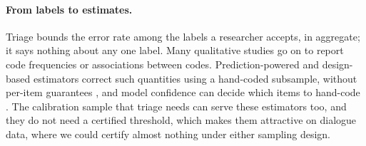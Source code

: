 \paragraph{From labels to estimates.} Triage bounds the error rate among the labels a researcher accepts, in aggregate; it
says nothing about any one label. Many qualitative studies go on to report code frequencies or associations between codes.
Prediction-powered and design-based estimators correct such quantities using a hand-coded subsample, without per-item
guarantees \citep{angelopoulos2023ppi,egami2023using}, and model confidence can decide which items to hand-code
\citep{gligoric2025unconfident}. The calibration sample that triage needs can serve these estimators too, and they do not
need a certified threshold, which makes them attractive on dialogue data, where we could certify almost nothing under either
sampling design.

